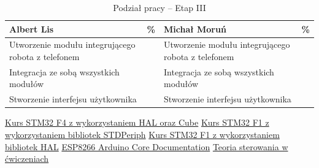 \documentclass[10pt, a4paper]{article}
\begin{document}
\begin{table}[H]
	\centering
	\begin{tabular}{|L{7cm}|L{0.8cm}||L{7cm}|L{0.8cm}|}
		\hline
		\hline
		\textbf{Albert Lis} & 
		\% & 
		\textbf{Michał Moruń} & \%\\
		\hline
		\hline
		Utworzenie modułu integrującego robota z telefonem & &	
		Utworzenie modułu integrującego robota z telefonem &\\
		\hline
		Integracja ze sobą wszystkich modułów & &
		Integracja ze sobą wszystkich modułów & \\
		\hline
		 Stworzenie interfejsu użytkownika & &
		 Stworzenie interfejsu użytkownika &\\
		\hline
	\end{tabular}
	\caption{Podział pracy -- Etap III}
	\label{tab:PodzialPracyEtap3}
\end{table}



\newpage
%
%
\begin{thebibliography}{9}
	
	\href{https://forbot.pl/blog/kurs-stm32-f4-1-czas-poznac-hal-spis-tresci-kursu-id14114}{Kurs STM32 F4 z wykorzystaniem HAL oraz Cube}
	\href{https://forbot.pl/blog/stm32-praktyce-1-platforma-srodowisko-id2733}{Kurs STM32 F1 z wykorzystaniem bibliotek STDPeriph}
	\href{https://forbot.pl/blog/kurs-stm32-f1-migracja-na-hal-wstep-spis-tresci-id23580} {Kurs STM32 F1 z wykorzystaniem bibliotek HAL}
	\href{https://media.readthedocs.org/pdf/arduino-esp8266/docs_to_readthedocs/arduino-esp8266.pdf} {ESP8266 Arduino Core Documentation}
	\href{https://docer.pl/doc/n5xcex8} {Teoria sterowania w ćwiczeniach}
	
\end{thebibliography}
\end{document}
